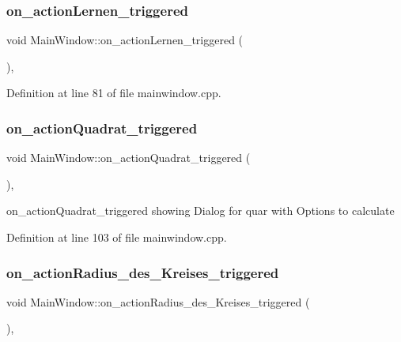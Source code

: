 \subsubsection{\texorpdfstring{on\+\_\+action\+Lernen\+\_\+triggered}{on\_actionLernen\_triggered}}
{\footnotesize\ttfamily void Main\+Window\+::on\+\_\+action\+Lernen\+\_\+triggered (\begin{DoxyParamCaption}{ }\end{DoxyParamCaption})\hspace{0.3cm}{\ttfamily [private]}, {\ttfamily [slot]}}



Definition at line 81 of file mainwindow.\+cpp.

\mbox{\label{class_main_window_a9f891fe4873bb00a7cb186f6d9acb9fe}} 
\subsubsection{\texorpdfstring{on\+\_\+action\+Quadrat\+\_\+triggered}{on\_actionQuadrat\_triggered}}
{\footnotesize\ttfamily void Main\+Window\+::on\+\_\+action\+Quadrat\+\_\+triggered (\begin{DoxyParamCaption}{ }\end{DoxyParamCaption})\hspace{0.3cm}{\ttfamily [private]}, {\ttfamily [slot]}}



on\+\_\+action\+Quadrat\+\_\+triggered showing Dialog for quar with Options to calculate 



Definition at line 103 of file mainwindow.\+cpp.

\mbox{\label{class_main_window_a806656e7a0c374ac6e3d42fdf08edc7b}} 
\subsubsection{\texorpdfstring{on\+\_\+action\+Radius\+\_\+des\+\_\+\+Kreises\+\_\+triggered}{on\_actionRadius\_des\_Kreises\_triggered}}
{\footnotesize\ttfamily void Main\+Window\+::on\+\_\+action\+Radius\+\_\+des\+\_\+\+Kreises\+\_\+triggered (\begin{DoxyParamCaption}{ }\end{DoxyParamCaption})\hspace{0.3cm}{\ttfamily [private]}, {\ttfamily [slot]}}



